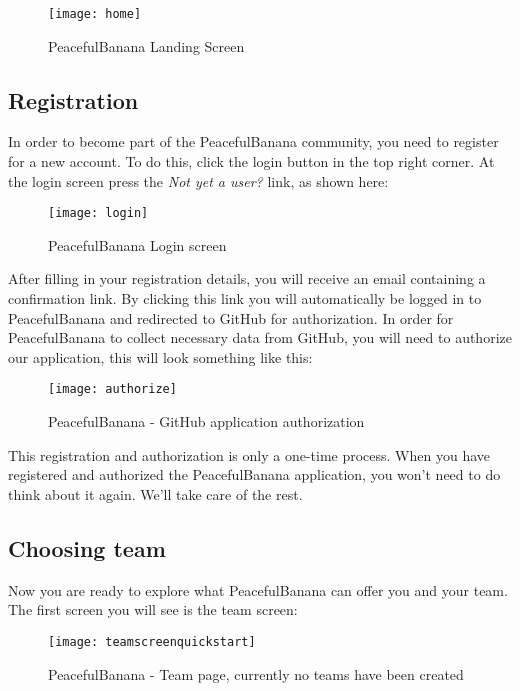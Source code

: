 \begin{figure}[h!]
\label{homescreen}
\centering
	\texttt{[image: home]}
\caption{PeacefulBanana Landing Screen}
\end{figure}

\pagebreak
\subsection{Registration}
In order to become part of the PeacefulBanana community, you need to register for a new account. To do this, click the login button in the top right corner. At the login screen press the 
\textit{Not yet a user?} link, as shown here:
\begin{figure}[h!]
\label{login}
\centering
	\texttt{[image: login]}
\caption{PeacefulBanana Login screen}
\end{figure}

After filling in your registration details, you will receive an email containing a confirmation link. By clicking this link you will automatically be logged in to PeacefulBanana and redirected to GitHub for authorization. 
In order for PeacefulBanana to collect necessary data from GitHub, you will need to authorize our application, this will look something like this: 

\begin{figure}[h!]
\label{authorize}
\centering
	\texttt{[image: authorize]}
\caption{PeacefulBanana - GitHub application authorization}
\end{figure}

This registration and authorization is only a one-time process. When you have registered and authorized the PeacefulBanana application, you won't need to do think about it again. We'll take care of the rest. 
\pagebreak

%
%
\subsection{Choosing team}
Now you are ready to explore what PeacefulBanana can offer you and your team. The first screen you will see is the team screen:

\begin{figure}[h!]
\label{teamscreen}
\centering
	\texttt{[image: teamscreenquickstart]}
\caption{PeacefulBanana - Team page, currently no teams have been created}
\end{figure}

